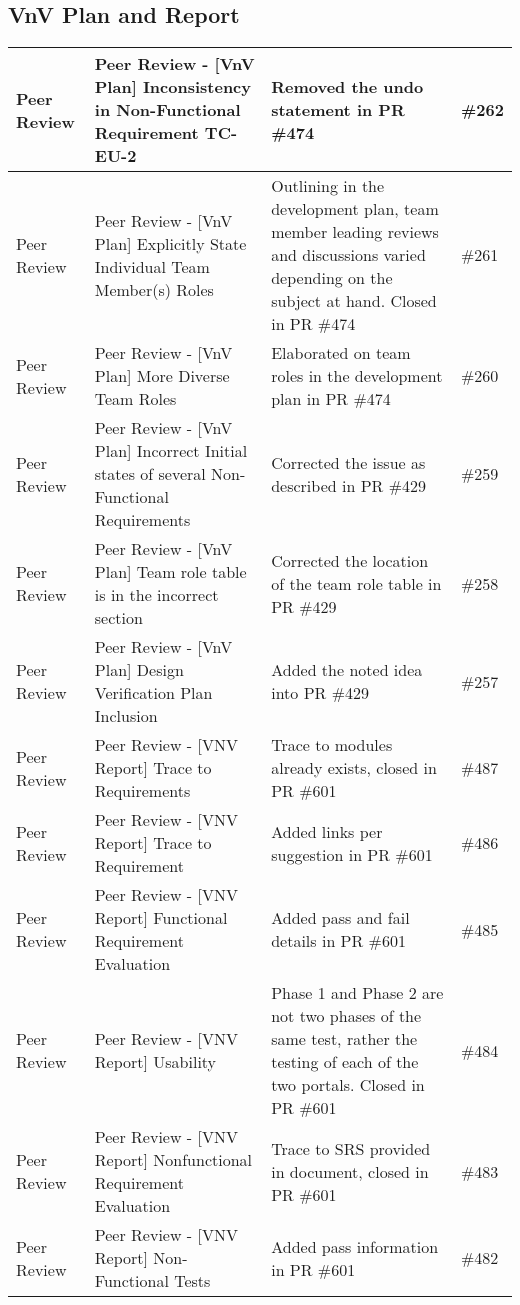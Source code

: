 \documentclass{article}
\begin{document}
\subsection{VnV Plan and Report}
\begin{longtable}{|m{3cm}|m{3cm}|m{5cm}|m{1cm}|}
  \hline
   Peer Review & Peer Review - [VnV Plan] Inconsistency in Non-Functional Requirement TC-EU-2 & Removed the undo statement in PR \#474 & \#262\\
   \hline
   Peer Review & Peer Review - [VnV Plan] Explicitly State Individual Team Member(s) Roles & Outlining in the development plan, team member leading reviews 
   and discussions varied depending on the subject at hand. Closed in PR \#474 & \#261\\
   \hline
   Peer Review & Peer Review - [VnV Plan] More Diverse Team Roles & Elaborated on team roles in the development plan in PR \#474 & \#260\\
   \hline
   Peer Review & Peer Review - [VnV Plan] Incorrect Initial states of several Non-Functional Requirements & Corrected the issue as described
   in PR \#429 & \#259\\
   \hline
   Peer Review & Peer Review - [VnV Plan] Team role table is in the incorrect section & Corrected the location of the team role 
   table in PR \#429 & \#258\\
   \hline
   Peer Review & Peer Review - [VnV Plan] Design Verification Plan Inclusion & Added the noted idea into PR \#429 & \#257\\
   \hline
   Peer Review & Peer Review - [VNV Report] Trace to Requirements & Trace to modules already exists, closed in PR \#601 & \#487\\
  \hline
  Peer Review & Peer Review - [VNV Report] Trace to Requirement & Added links per suggestion in PR \#601 & \#486\\
  \hline
  Peer Review & Peer Review - [VNV Report] Functional Requirement Evaluation & Added pass and fail details in PR \#601 & \#485\\
  \hline
  Peer Review & Peer Review - [VNV Report] Usability & Phase 1 and Phase 2 are not two phases of the same test, 
  rather the testing of each of the two portals. Closed in PR \#601 & \#484\\
  \hline
  Peer Review & Peer Review - [VNV Report] Nonfunctional Requirement Evaluation & Trace to SRS provided in document,
  closed in PR \#601 & \#483\\
  \hline
  Peer Review & Peer Review - [VNV Report] Non-Functional Tests & Added pass information in PR \#601 & \#482\\
  \hline
  \end{longtable}
\end{document}
